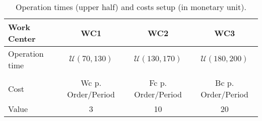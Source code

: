 \documentclass[envcountsame]{llncs}
\begin{document}

\begin{table}[t]
  \centering
  \begin{tabular}{|l||c|c|c|}
    \hline
    Work Center & WC1 & WC2 & WC3\\
    \hline
    Operation time & \(\mathcal{U}(70,130)\) & \(\mathcal{U}(130,170)\) & \(\mathcal{U}(180,200)\)\\
    \hline
    \multicolumn{4}{c}{}\\
    \hline
    Cost & Wc p. Order/Period & Fc p. Order/Period & Bc p. Order/Period \\
    \hline
    Value & 3 & 10 & 20 \\
    \hline
  \end{tabular}

  \caption{\label{tbl:costs}Operation times (upper half) and costs setup (in monetary unit).}
\end{table}



\end{document}
